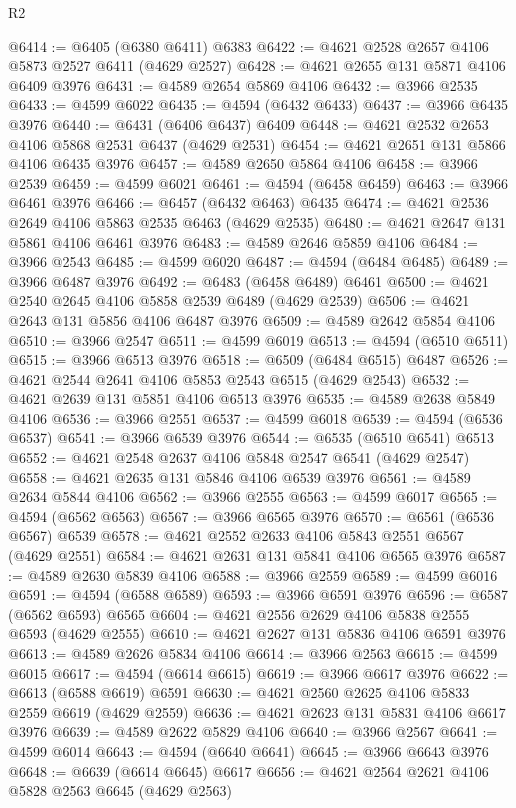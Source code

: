 \begin{lexlean}{R2}
\begin{coremodule}
@6414 := @6405 (@6380 @6411) @6383
@6422 := @4621 @2528 @2657 @4106 @5873 @2527 @6411 (@4629 @2527)
@6428 := @4621 @2655 @131 @5871 @4106 @6409 @3976
@6431 := @4589 @2654 @5869 @4106
@6432 := @3966 @2535
@6433 := @4599 @6022
@6435 := @4594 (@6432 @6433)
@6437 := @3966 @6435 @3976
@6440 := @6431 (@6406 @6437) @6409
@6448 := @4621 @2532 @2653 @4106 @5868 @2531 @6437 (@4629 @2531)
@6454 := @4621 @2651 @131 @5866 @4106 @6435 @3976
@6457 := @4589 @2650 @5864 @4106
@6458 := @3966 @2539
@6459 := @4599 @6021
@6461 := @4594 (@6458 @6459)
@6463 := @3966 @6461 @3976
@6466 := @6457 (@6432 @6463) @6435
@6474 := @4621 @2536 @2649 @4106 @5863 @2535 @6463 (@4629 @2535)
@6480 := @4621 @2647 @131 @5861 @4106 @6461 @3976
@6483 := @4589 @2646 @5859 @4106
@6484 := @3966 @2543
@6485 := @4599 @6020
@6487 := @4594 (@6484 @6485)
@6489 := @3966 @6487 @3976
@6492 := @6483 (@6458 @6489) @6461
@6500 := @4621 @2540 @2645 @4106 @5858 @2539 @6489 (@4629 @2539)
@6506 := @4621 @2643 @131 @5856 @4106 @6487 @3976
@6509 := @4589 @2642 @5854 @4106
@6510 := @3966 @2547
@6511 := @4599 @6019
@6513 := @4594 (@6510 @6511)
@6515 := @3966 @6513 @3976
@6518 := @6509 (@6484 @6515) @6487
@6526 := @4621 @2544 @2641 @4106 @5853 @2543 @6515 (@4629 @2543)
@6532 := @4621 @2639 @131 @5851 @4106 @6513 @3976
@6535 := @4589 @2638 @5849 @4106
@6536 := @3966 @2551
@6537 := @4599 @6018
@6539 := @4594 (@6536 @6537)
@6541 := @3966 @6539 @3976
@6544 := @6535 (@6510 @6541) @6513
@6552 := @4621 @2548 @2637 @4106 @5848 @2547 @6541 (@4629 @2547)
@6558 := @4621 @2635 @131 @5846 @4106 @6539 @3976
@6561 := @4589 @2634 @5844 @4106
@6562 := @3966 @2555
@6563 := @4599 @6017
@6565 := @4594 (@6562 @6563)
@6567 := @3966 @6565 @3976
@6570 := @6561 (@6536 @6567) @6539
@6578 := @4621 @2552 @2633 @4106 @5843 @2551 @6567 (@4629 @2551)
@6584 := @4621 @2631 @131 @5841 @4106 @6565 @3976
@6587 := @4589 @2630 @5839 @4106
@6588 := @3966 @2559
@6589 := @4599 @6016
@6591 := @4594 (@6588 @6589)
@6593 := @3966 @6591 @3976
@6596 := @6587 (@6562 @6593) @6565
@6604 := @4621 @2556 @2629 @4106 @5838 @2555 @6593 (@4629 @2555)
@6610 := @4621 @2627 @131 @5836 @4106 @6591 @3976
@6613 := @4589 @2626 @5834 @4106
@6614 := @3966 @2563
@6615 := @4599 @6015
@6617 := @4594 (@6614 @6615)
@6619 := @3966 @6617 @3976
@6622 := @6613 (@6588 @6619) @6591
@6630 := @4621 @2560 @2625 @4106 @5833 @2559 @6619 (@4629 @2559)
@6636 := @4621 @2623 @131 @5831 @4106 @6617 @3976
@6639 := @4589 @2622 @5829 @4106
@6640 := @3966 @2567
@6641 := @4599 @6014
@6643 := @4594 (@6640 @6641)
@6645 := @3966 @6643 @3976
@6648 := @6639 (@6614 @6645) @6617
@6656 := @4621 @2564 @2621 @4106 @5828 @2563 @6645 (@4629 @2563)

\end{coremodule}
\end{lexlean}
